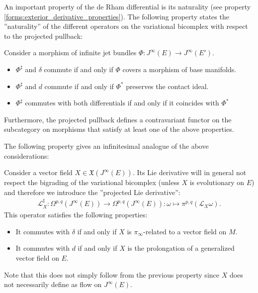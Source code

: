     An important property of the de Rham differential is its naturality (see property \ref{forms:exterior_derivative_properties}). The following property states the ''naturality'' of the different operators on the variational bicomplex with respect to the projected pullback:
    \begin{property}
        Consider a morphism of infinite jet bundles $\Phi:J^\infty(E)\rightarrow J^\infty(E')$.
        \begin{itemize}
            \item $\Phi^\sharp$ and $\delta$ commute if and only if $\Phi$ covers a morphism of base manifolds.
            \item $\Phi^\sharp$ and $d$ commute if and only if $\Phi^*$ preserves the contact ideal.
            \item $\Phi^\sharp$ commutes with both differentials if and only if it coincides with $\Phi^*$
        \end{itemize}
        Furthermore, the projected pullback defines a contravariant functor on the subcategory on morphisms that satisfy at least one of the above properties.
    \end{property}

    The following property gives an infinitesimal analogue of the above considerations:
    \begin{property}
        Consider a vector field $X\in\mathfrak{X}(J^\infty(E))$. Its Lie derivative will in general not respect the bigrading of the variational bicomplex (unless $X$ is evolutionary on $E$) and therefore we introduce the ''projected Lie derivative'':
        \begin{gather}
            \mathcal{L}^\sharp_X:\Omega^{p,q}(J^\infty(E))\rightarrow\Omega^{p,q}(J^\infty(E)):\omega\mapsto\pi^{p,q}(\mathcal{L}_X\omega).
        \end{gather}
        This operator satisfies the following properties:
        \begin{itemize}
            \item It commutes with $\delta$ if and only if $X$ is $\pi_\infty$-related to a vector field on $M$.
            \item It commutes with $d$ if and only if $X$ is the prolongation of a generalized vector field on $E$.
        \end{itemize}
        Note that this does not simply follow from the previous property since $X$ does not necessarily define as flow on $J^\infty(E)$.
    \end{property}

